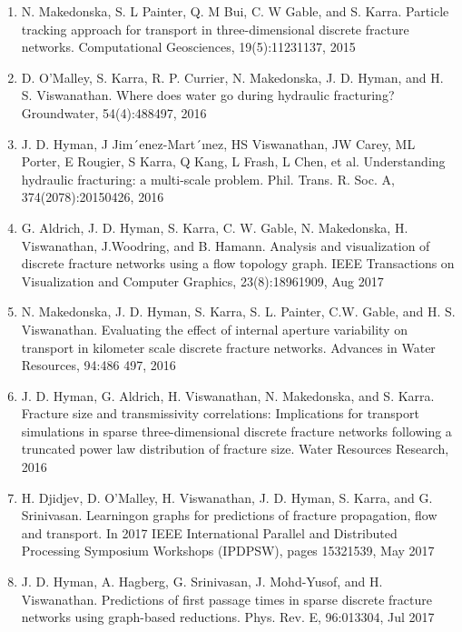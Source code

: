 \documentclass[letterpaper,10pt,english]{sphinxmanual}
\begin{document}
\begin{enumerate}
\item {} 
N. Makedonska, S. L Painter, Q. M Bui, C. W Gable, and S. Karra. Particle tracking approach for transport in three-dimensional discrete fracture networks. Computational Geosciences, 19(5):1123\textendash{}1137, 2015

\item {} 
D. O’Malley, S. Karra, R. P. Currier, N. Makedonska, J. D. Hyman, and H. S. Viswanathan. Where does water go during hydraulic fracturing? Groundwater, 54(4):488\textendash{}497, 2016

\item {} 
J. D. Hyman, J Jim´enez-Mart´ınez, HS Viswanathan, JW Carey, ML Porter, E Rougier, S Karra, Q Kang, L Frash, L Chen, et al. Understanding hydraulic fracturing: a multi-scale problem. Phil. Trans. R. Soc. A, 374(2078):20150426, 2016

\item {} 
G. Aldrich, J. D. Hyman, S. Karra, C. W. Gable, N. Makedonska, H. Viswanathan, J.Woodring, and B. Hamann. Analysis and visualization of discrete fracture networks using a flow topology graph. IEEE Transactions on Visualization and Computer Graphics, 23(8):1896\textendash{}1909, Aug 2017

\item {} 
N. Makedonska, J. D. Hyman, S. Karra, S. L. Painter, C.W. Gable, and H. S. Viswanathan. Evaluating the effect of internal aperture variability on transport in kilometer scale discrete fracture networks. Advances in Water Resources, 94:486 \textendash{} 497, 2016

\item {} 
J. D. Hyman, G. Aldrich, H. Viswanathan, N. Makedonska, and S. Karra. Fracture size and transmissivity correlations: Implications for transport simulations in sparse three-dimensional discrete fracture networks following a truncated power law distribution of fracture size. Water Resources Research, 2016

\item {} 
H. Djidjev, D. O’Malley, H. Viswanathan, J. D. Hyman, S. Karra, and G. Srinivasan. Learningon graphs for predictions of fracture propagation, flow and transport. In 2017 IEEE International Parallel and Distributed Processing Symposium Workshops (IPDPSW), pages 1532\textendash{}1539, May 2017

\item {} 
J. D. Hyman, A. Hagberg, G. Srinivasan, J. Mohd-Yusof, and H. Viswanathan. Predictions of first passage times in sparse discrete fracture networks using graph-based reductions. Phys. Rev. E, 96:013304, Jul 2017


\end{enumerate}
\end{document}
